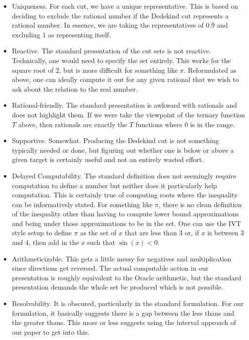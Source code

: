 \documentclass[12pt]{article}
\begin{document}
\begin{itemize}
    \item Uniqueness. For each cut, we have a unique representative. This is based on deciding to exclude the rational number if the Dedekind cut represents a rational number. In essence, we are taking the representatives of $0.\bar{9}$ and excluding $1$ as representing itself. 
    \item Reactive. The standard presentation of the cut sets is not reactive. Technically, one would need to specify the set entirely. This works for the square root of 2, but is more difficult for something like $\pi$. Reformulated as above, one can ideally compute it out for any given rational that we wish to ask about the relation to the real number. 
    \item Rational-friendly. The standard presentation is awkward with rationals and does not highlight them. If we were take the viewpoint of the ternary function $T$ above, then rationals are exactly the $T$ functions where $0$ is in the range. 
    \item Supportive. Somewhat. Producing the Dedekind cut is not something typically needed or done, but figuring out whether one is below or above a given target is certainly useful and not an entirely wasted effort. 
    \item Delayed Computability. The standard definition does not seemingly require computation to define a number but neither does it particularly help computation. This is certainly true of computing roots where the inequality can be informatively stated. For something like $\pi$, there is no clean definition of the inequality other than having to compute lower bound approximations and being under those approximations to be in the set. One can use the IVT style setup to define $\pi$ as the set of $x$ that are less than 3 or, if $x$ is between 3 and 4, then add in the $x$ such that $\sin(x) < 0$. 
    \item Arithmeticizable. This gets a little messy for negatives and multiplication since directions get reversed. The actual computable action in our presentation is roughly equivalent to the Oracle arithmetic, but the standard presentation demands the whole set be produced which is not possible.
    \item Resolvability. It is obscured, particularly in the standard formulation. For our formulation, it basically suggests there is a gap between the less thans and the greater thans. This more or less suggests using the interval approach of our paper to get into this. 
\end{itemize}
\end{document}
